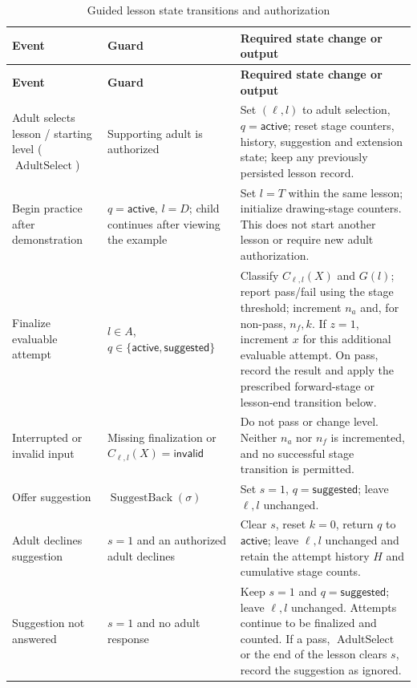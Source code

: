 \documentclass[12pt]{article}
\renewcommand{\_}{\textunderscore\allowbreak}%
\begin{document}
{\small
\begin{longtable}{@{}p{}p{}p{}@{}}
\caption{Guided lesson state transitions and
authorization}\label{tab:lrn-transitions}\\
\toprule
\textbf{Event} & \textbf{Guard} & \textbf{Required state change or output}\\
\midrule
\endfirsthead
\toprule
\textbf{Event} & \textbf{Guard} & \textbf{Required state change or output}\\
\midrule
\endhead
\bottomrule
\endlastfoot
Adult selects lesson / starting level ($\operatorname{AdultSelect}$) &
Supporting adult is authorized & Set $(\ell,l)$ to adult selection,
$q=\textsf{active}$; reset stage counters, history, suggestion and extension
state; keep any previously persisted lesson record.\\
\addlinespace
Begin practice after demonstration & $q=\textsf{active}$, $l=D$; child continues
after viewing the example & Set $l=T$ within the same lesson; initialize
drawing-stage counters. This does not start another lesson or require new adult
authorization.\\
\addlinespace
Finalize evaluable attempt & $l\in A$, $q\in\{\textsf{active},
\textsf{suggested}\}$ & Classify
$C_{\ell,l}(X)$ and $G(l)$; report pass/fail using the stage threshold;
increment $n_a$ and, for non-pass, $n_f,k$. If $z=1$, increment $x$ for this
additional evaluable attempt. On pass, record the result and apply the
prescribed forward-stage or lesson-end transition below.\\
\addlinespace
Interrupted or invalid input & Missing finalization or
$C_{\ell,l}(X)=\textsf{invalid}$ & Do not pass or change level. Neither $n_a$
nor $n_f$ is incremented, and no successful stage transition is permitted.\\
\addlinespace
Offer suggestion & $\operatorname{SuggestBack}(\sigma)$ & Set $s=1$,
$q=\textsf{suggested}$; leave $\ell,l$ unchanged.\\
\addlinespace
Adult declines suggestion & $s=1$ and an authorized adult declines & Clear
$s$, reset $k=0$, return $q$ to $\textsf{active}$; leave $\ell,l$ unchanged and
retain the attempt history $H$ and cumulative stage counts.\\
\addlinespace
Suggestion not answered & $s=1$ and no adult response & Keep $s=1$ and
$q=\textsf{suggested}$; leave $\ell,l$ unchanged. Attempts continue to be
finalized and counted. If a pass, $\operatorname{AdultSelect}$ or the end of
the lesson clears $s$, record the suggestion as ignored.\\

\end{longtable}}
\end{document}

